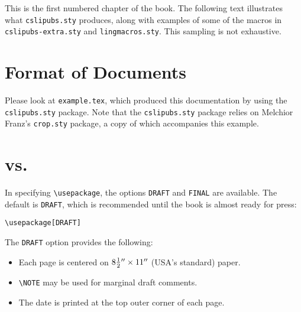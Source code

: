 



This is the first numbered chapter of the book.  The following
text illustrates what \texttt{cslipubs.sty} produces, along with
examples of some of the macros in \texttt{cslipubs-extra.sty} and
\texttt{lingmacros.sty}.  This sampling is not exhaustive.



\section{Format of Documents}


Please look at \texttt{example.tex}, which produced this
documentation by using the \texttt{cslipubs.sty} package.
Note that the \texttt{cslipubs.sty} package relies on
Melchior Franz's \texttt{crop.sty} package, a copy of
which accompanies this example.



\section {\protect{} vs.
          \protect{}}



In specifying \texttt{\backslash usepackage},
the options \texttt{\smaller DRAFT} and \texttt{\smaller FINAL}
are available.  The default is \texttt{\smaller DRAFT}, which
is recommended until the book is almost ready for press:

   \smallskip
   \texttt{\backslash usepackage[{\smaller DRAFT}]}
   \smallskip

\noindent
The \texttt{\smaller DRAFT} option provides the following:

\begin{itemize}
\item  Each page is centered on $8 {1 \over 2}{}'' \times 11''$
       (USA's standard) paper.

\item  \texttt{\backslash NOTE\braced{\,}} may be used for marginal
       draft comments.

\item  The date is printed at the top outer corner of each page.
\end{itemize}

